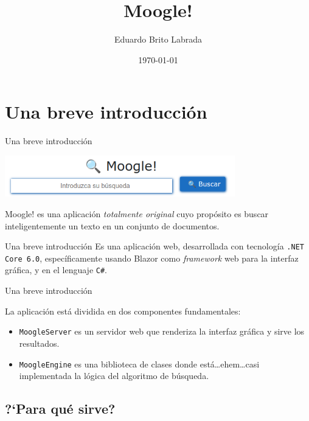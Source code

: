 \documentclass{beamer}
\title[Moogle!]{\LARGE Moogle!}
\author{Eduardo Brito Labrada}
\institute[Universidad de La Habana]
{
  Facultad de Matem\'atica y Computaci\'on
}
\date{\today}
\begin{document}
\begin{frame}
\maketitle
\end{frame}

\section{Una breve introducci\'on}

\begin{frame}{Una breve introducci\'on}
  \begin{center}
    \includegraphics[width=10cm]{images/moogle.png}
  \end{center}

  Moogle! es una aplicación {\em totalmente original} cuyo propósito es buscar
  inteligentemente un texto en un conjunto de documentos.
\end{frame}

\begin{frame}{Una breve introducci\'on}
  Es una aplicación web, desarrollada con tecnología {\tt .NET Core 6.0}, específicamente
  usando Blazor como {\it framework} web para la interfaz gráfica, y en el
  lenguaje {\tt C\#}. \\
\end{frame}

\begin{frame}{Una breve introducci\'on}

  La aplicación está dividida en dos componentes fundamentales:

  \begin{itemize}[<+->]
    \item {\tt MoogleServer} es un servidor web que renderiza la interfaz gráfica y sirve los resultados.
    \item {\tt MoogleEngine} es una biblioteca de clases donde está\dots ehem\dots casi implementada la lógica del algoritmo de búsqueda.
  \end{itemize}
\end{frame}

\subsection{?`Para qu\'e sirve?}
\end{document}
